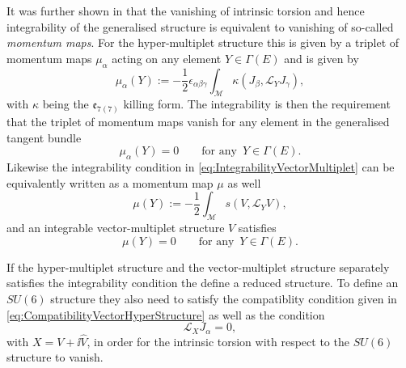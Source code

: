 It was further shown in \cite{Ashmore:2015joa} that the vanishing of intrinsic torsion and hence integrability of the generalised structure is equivalent to vanishing of so-called \emph{momentum maps}. For the hyper-multiplet structure this is given by a triplet of momentum maps $\mu_\alpha$ acting on any element $Y\in\Gamma(E)$ and is given by 
\begin{equation}
    \mu_\alpha(Y):= -\frac{1}{2}\epsilon_{\alpha\beta\gamma}\int_\mathcal{M}\kappa(J_\beta,\mathscr{L}_YJ_\gamma),
\end{equation}
with $\kappa$ being the $\mathfrak{e}_{7(7)}$ killing form. The integrability is then the requirement that the triplet of momentum maps vanish for any element in the generalised tangent bundle
\begin{equation}
    \mu_\alpha(Y) = 0\qquad \text{for any }\, Y\in\Gamma(E).
\end{equation}
Likewise the integrability condition in \eqref{eq:IntegrabilityVectorMultiplet} can be equivalently written as a momentum map $\mu$ as well
\begin{equation}
    \mu(Y) := -\frac{1}{2}\int_\mathcal{M}s(V,\mathscr{L}_YV),
\end{equation}
and an integrable vector-multiplet structure $V$ satisfies 
\begin{equation}
    \mu(Y) = 0\qquad \text{for any }\, Y\in\Gamma(E).
\end{equation}

If the hyper-multiplet structure and the vector-multiplet structure separately satisfies the integrability condition the define a reduced structure. To define an $SU(6)$ structure they also need to satisfy the compatiblity condition given in \eqref{eq:CompatibilityVectorHyperStructure} as well as the condition 
\begin{equation}
\mathscr{L}_XJ_\alpha = 0,
\end{equation}
with $X=V+\ii \hat{V}$, in order for the intrinsic torsion with respect to the $SU(6)$ structure to vanish. 

